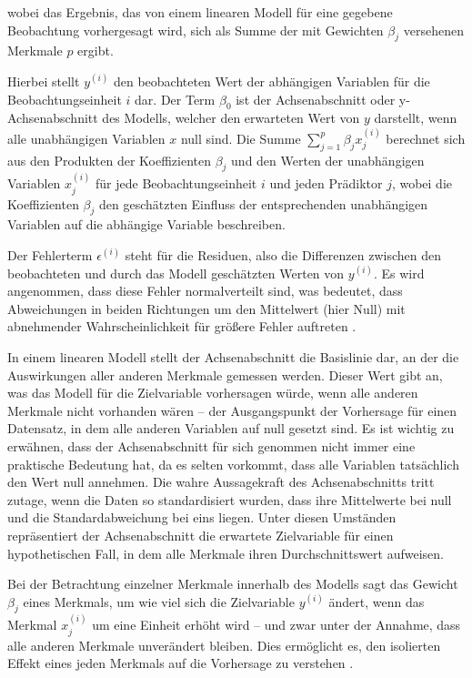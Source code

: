 wobei das Ergebnis, das von einem linearen Modell für eine gegebene Beobachtung vorhergesagt wird, sich als Summe der mit 
Gewichten $\beta_j$ versehenen Merkmale $p$ ergibt.

Hierbei stellt $y^{(i)}$ den beobachteten Wert der abhängigen Variablen für die Beobachtungseinheit
$i$ dar. Der Term $\beta_0$ ist der Achsenabschnitt oder y-Achsenabschnitt des Modells, 
welcher den erwarteten Wert von $y$ darstellt, wenn alle unabhängigen Variablen $x$ null sind. 
Die Summe $\sum_{j=1}^{p} \beta_j x^{(i)}_j$ berechnet sich aus den Produkten der Koeffizienten 
$\beta_j$ und den Werten der unabhängigen Variablen $x^{(i)}_j$ für jede Beobachtungseinheit $i$ 
und jeden Prädiktor $j$, wobei die Koeffizienten $\beta_j$ den geschätzten Einfluss der 
entsprechenden unabhängigen Variablen auf die abhängige Variable beschreiben.

Der Fehlerterm $\epsilon^{(i)}$ steht für die Residuen, also die Differenzen zwischen den beobachteten 
und durch das Modell geschätzten Werten von $y^{(i)}$. Es wird angenommen, dass diese Fehler normalverteilt sind, 
was bedeutet, dass Abweichungen in beiden Richtungen um den Mittelwert (hier Null) 
mit abnehmender Wahrscheinlichkeit für größere Fehler auftreten \cite[S. 37]{Molnar_2022}.

In einem linearen Modell stellt der Achsenabschnitt die Basislinie dar, an der die Auswirkungen aller 
anderen Merkmale gemessen werden. Dieser Wert gibt an, was das Modell für die Zielvariable vorhersagen 
würde, wenn alle anderen Merkmale nicht vorhanden wären – der Ausgangspunkt der Vorhersage 
für einen Datensatz, in dem alle anderen Variablen auf null gesetzt sind. 
Es ist wichtig zu erwähnen, dass der Achsenabschnitt für sich genommen nicht immer eine praktische 
Bedeutung hat, da es selten vorkommt, dass alle Variablen tatsächlich den Wert null annehmen. 
Die wahre Aussagekraft des Achsenabschnitts tritt zutage, wenn die Daten so standardisiert wurden, 
dass ihre Mittelwerte bei null und die Standardabweichung bei eins liegen. Unter diesen Umständen repräsentiert der Achsenabschnitt 
die erwartete Zielvariable für einen hypothetischen Fall, in dem alle Merkmale ihren Durchschnittswert 
aufweisen.

Bei der Betrachtung einzelner Merkmale innerhalb des Modells sagt das Gewicht $\beta_j$ eines Merkmals, 
um wie viel sich die Zielvariable $y^{(i)}$ ändert, wenn das Merkmal $x^{(i)}_j$ um eine Einheit erhöht wird – und zwar unter 
der Annahme, dass alle anderen Merkmale unverändert bleiben. 
Dies ermöglicht es, den isolierten Effekt eines jeden Merkmals auf die Vorhersage zu verstehen \cite[S. 39]{Molnar_2022}.

